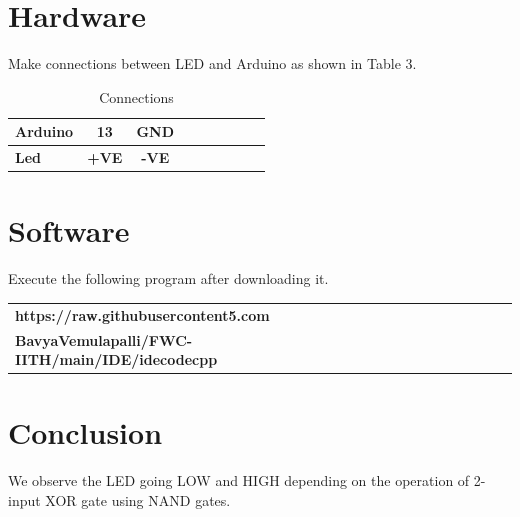 \documentclass[10pt, a4paper]{article}
\begin{document}
\section{Hardware}

Make connections between LED and Arduino as shown in Table 3.

\begin{table}[H]
 \begin{center}
    \begin{tabular}{|l|c|c|c|c|c|c|c|c} \hline\textbf{Arduino} & \textbf{13} & \textbf{GND} \\ \hline
 \textbf{Led} & \textbf{+VE} & \textbf{-VE}\\ \hline
\end{tabular}   
\end{center}
\caption{Connections}
\label{table 3}
\end{table}


\section{Software}

Execute the following program after downloading it.

\begin{table}[H]
 \begin{center}
    \begin{tabular}{|l|c|c|c|c|c|c|c|c}\hline\textbf{https://raw.githubusercontent5.com}\\
    \textbf{BavyaVemulapalli/FWC-IITH/main/IDE/idecodecpp} \\ \hline
\end{tabular}   
\end{center}
\end{table}


\section{Conclusion}
We observe the LED going LOW and HIGH depending on the operation of 2-input XOR gate using NAND gates.
\end{document}
